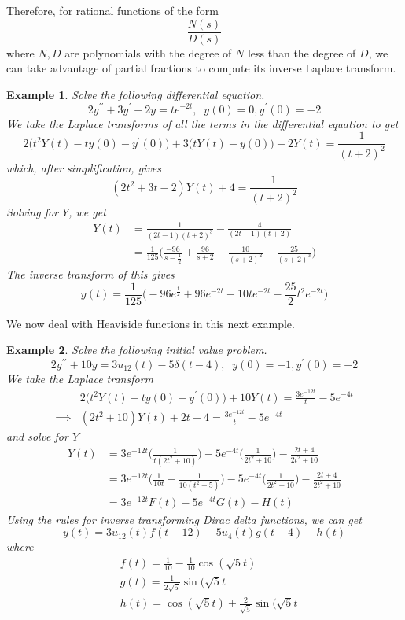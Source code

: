 \documentclass{article}
\newtheorem{example}{Example}[section]
\theoremstyle{remark}
\theoremstyle{definition}
\begin{document}
Therefore, for rational functions of the form 
\[\frac{N(s)}{D(s)}\]
where $N, D$ are polynomials with the degree of $N$ less than the degree of $D$, we can take advantage of partial fractions to compute its inverse Laplace transform. 

\begin{example}
Solve the following differential equation. 
\[2 y^{\prime\prime} + 3 y^\prime - 2y = t e^{-2t}, \;\; y(0) = 0, y^\prime (0) = -2\]
We take the Laplace transforms of all the terms in the differential equation to get
\[2\big( t^2 Y(t) - t y(0) - y^\prime (0)\big) + 3 \big( t Y(t) - y(0)\big) - 2 Y(t) = \frac{1}{(t+2)^2}\]
which, after simplification, gives
\[(2t^2 + 3t - 2) Y(t) + 4 = \frac{1}{(t+2)^2}\]
Solving for $Y$, we get
\begin{align*}
    Y(t) & = \frac{1}{(2t-1)(t+2)^3} - \frac{4}{(2t-1)(t+2)} \\
    & = \frac{1}{125} \bigg(\frac{-96}{s-\frac{1}{2}} + \frac{96}{s+2} - \frac{10}{(s+2)^2} - \frac{25}{(s+2)^3} \bigg)
\end{align*}
The inverse transform of this gives 
\[y(t) = \frac{1}{125} \Big( -96 e^{\frac{t}{2}} + 96 e^{-2t} - 10t e^{-2t} - \frac{25}{2} t^2 e^{-2t}\Big) \]
\end{example}

We now deal with Heaviside functions in this next example. 
\begin{example}
Solve the following initial value problem. 
\[2 y^{\prime\prime} + 10 y = 3 u_{12} (t) - 5 \delta(t - 4), \;\; y(0) = -1, y^\prime (0) = -2\]
We take the Laplace transform 
\begin{align*}
    & 2 \big( t^2 Y(t) - t y(0) - y^\prime (0) \big) + 10 Y(t) = \frac{3 e^{-12t}}{t} - 5 e^{-4 t} \\
    \implies & (2 t^2 + 10) Y(t) + 2t + 4 = \frac{3 e^{-12t}}{t} - 5 e^{-4t}
\end{align*}
and solve for $Y$
\begin{align*}
    Y(t) & = 3 e^{-12t} \bigg(\frac{1}{t (2t^2 + 10)} \bigg) - 5e^{-4t} \bigg(\frac{1}{2t^2 + 10} \bigg) - \frac{2t+4}{2t^2 + 10} \\
    & = 3 e^{-12t} \bigg(\frac{1}{10t} - \frac{1}{10(t^2+5)} \bigg) - 5e^{-4t} \bigg(\frac{1}{2t^2 + 10} \bigg) - \frac{2t+4}{2t^2 + 10} \\
    & = 3 e^{-12t} F(t) - 5 e^{-4t} G(t) - H(t)
\end{align*}
Using the rules for inverse transforming Dirac delta functions, we can get
\[y (t) = 3 u_{12} (t) f(t-12) - 5 u_4 (t) g(t-4) - h(t)\]
where 
\begin{align*}
    & f(t) = \frac{1}{10} - \frac{1}{10} \cos{(\sqrt{5} t)} \\
    & g(t) = \frac{1}{2 \sqrt{5}} \sin{(\sqrt{5}t} \\
    & h(t) = \cos{(\sqrt{5}t)} + \frac{2}{\sqrt{5}} \sin{(\sqrt{5}t}
\end{align*}
\end{example}
\end{document}
